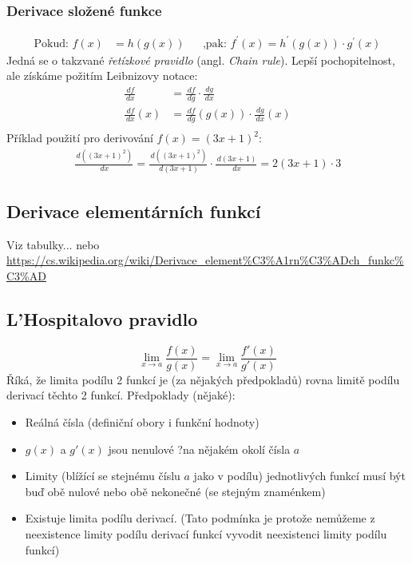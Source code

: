 \documentclass[12pt]{article}
\begin{document}
\subsubsection{Derivace složené funkce}
\begin{align}
\text{Pokud: }f(x) &= h(g(x)) && \text{,pak: }
f^{\prime}(x) = h^{\prime}(g(x)) \cdot g^{\prime}(x)
\end{align}
Jedná se o takzvané \emph{řetízkové pravidlo} (angl. \emph{Chain rule}). Lepší pochopitelnost, ale získáme požitím Leibnizovy notace:
\begin{align}
\frac{\,df}{\,dx} &= \frac{\,df}{\,dg} \cdot \frac{\,dg}{\,dx}\\
\frac{\,df}{\,dx}(x) &= \frac{\,df}{\,dg}(g(x)) \cdot \frac{\,dg}{\,dx}(x)\\
\end{align}
Příklad použití pro derivování $f(x) = (3x+1)^2$:
\begin{align*}
\frac{\,d((3x+1)^2)}{\,dx} = \frac{\,d((3x+1)^2)}{\,d(3x+1)} \cdot \frac{\,d(3x+1)}{\,dx} = 2(3x+1) \cdot 3
\end{align*}
\subsection{Derivace elementárních funkcí}
\label{sec:der_vzorce}
Viz tabulky... nebo \url{https://cs.wikipedia.org/wiki/Derivace_element\%C3\%A1rn\%C3\%ADch_funkc\%C3\%AD}
\subsection{L'Hospitalovo pravidlo}
\begin{equation}
\lim_{x \to a} \frac{f(x)}{g(x)} = \lim_{x \to a} \frac{f'(x)}{g'(x)}
\end{equation}
Říká, že limita podílu 2 funkcí je (za nějakých předpokladů) rovna limitě podílu derivací těchto 2 funkcí. Předpoklady (nějaké):
\begin{itemize}
\item Reálná čísla (definiční obory i funkční hodnoty)
\item $g(x)$ a $g'(x)$ jsou nenulové ?na nějakém okolí čísla $a$
\item Limity (blížící se stejnému číslu $a$ jako v podílu) jednotlivých funkcí musí být buď obě nulové nebo obě nekonečné (se stejným znaménkem)
\item Existuje limita podílu derivací. (Tato podmínka je protože nemůžeme z neexistence limity podílu derivací funkcí vyvodit neexistenci limity podílu funkcí)
\end{itemize}
\end{document}

